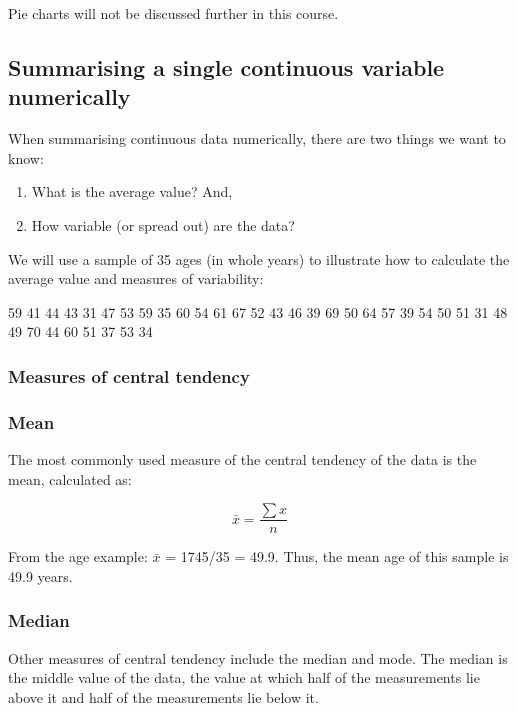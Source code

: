 \documentclass[
  a4paper,
]{memoir}
\providecommand{\tightlist}{%
  \setlength{\itemsep}{0pt}\setlength{\parskip}{0pt}}\usepackage{longtable,booktabs,array}
\begin{document}
Pie charts will not be discussed further in this course.

\hypertarget{summarising-a-single-continuous-variable-numerically}{%
\subsection{Summarising a single continuous variable
numerically}\label{summarising-a-single-continuous-variable-numerically}}

When summarising continuous data numerically, there are two things we
want to know:

\begin{enumerate}
\def\labelenumi{\arabic{enumi}.}
\tightlist
\item
  What is the average value? And,
\item
  How variable (or spread out) are the data?
\end{enumerate}

We will use a sample of 35 ages (in whole years) to illustrate how to
calculate the average value and measures of variability:

59 41 44 43 31 47 53 59 35 60 54 61 67 52 43 46 39 69 50 64 57 39 54 50
51 31 48 49 70 44 60 51 37 53 34

\hypertarget{measures-of-central-tendency}{%
\subsubsection{Measures of central
tendency}\label{measures-of-central-tendency}}

\hypertarget{mean}{%
\subsubsection{Mean}\label{mean}}

The most commonly used measure of the central tendency of the data is
the mean, calculated as:

\[\bar{x} = \frac{\sum x}{n}\]

From the age example: \(\bar{x}\) = 1745/35 = 49.9. Thus, the mean age
of this sample is 49.9 years.

\hypertarget{median}{%
\subsubsection{Median}\label{median}}

Other measures of central tendency include the median and mode. The
median is the middle value of the data, the value at which half of the
measurements lie above it and half of the measurements lie below it.
\end{document}
